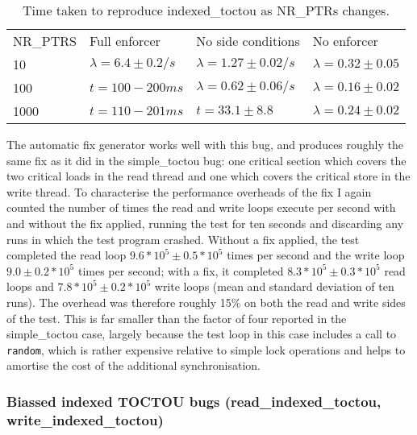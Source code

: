 \begin{table}
\begin{tabular}{llll}
NR\_PTRS & Full enforcer             & No side conditions          & No enforcer               \\
10       & $\lambda = 6.4 \pm 0.2/s$ & $\lambda = 1.27 \pm 0.02/s$ & $\lambda = 0.32 \pm 0.05$ \\
100      & $t = 100 - 200ms$         & $\lambda = 0.62 \pm 0.06/s$ & $\lambda = 0.16 \pm 0.02$ \\
1000     & $t = 110 - 201ms$         & $t = 33.1 \pm 8.8$          & $\lambda = 0.24 \pm 0.02$ \\
\end{tabular}
\caption{Time taken to reproduce indexed\_toctou as NR\_PTRs changes.}
\label{table:eval:indexedtoctou:nrptrs}
\end{table}

The automatic fix generator works well with this bug, and produces
roughly the same fix as it did in the simple\_toctou bug: one critical
section which covers the two critical loads in the read thread and one
which covers the critical store in the write thread.  To characterise
the performance overheads of the fix I again counted the number of
times the read and write loops execute per second with and without the
fix applied, running the test for ten seconds and discarding any runs
in which the test program crashed.  Without a fix applied, the test
completed the read loop $9.6 * 10^5 \pm 0.5 * 10^5$ times per second
and the write loop $9.0 \pm 0.2 * 10^5$ times per second; with a fix,
it completed $8.3 * 10^5 \pm 0.3 * 10^5$ read loops and $7.8 * 10^5
\pm 0.2 * 10^5$ write loops (mean and standard deviation of ten runs).
The overhead was therefore roughly 15\% on both the read and write
sides of the test.  This is far smaller than the factor of four reported in the
simple\_toctou case, largely because the test loop in this case
includes a call to \verb|random|, which is rather expensive relative
to simple lock operations and helps to amortise the cost of the
additional synchronisation.


\subsubsection{Biassed indexed TOCTOU bugs (read\_indexed\_toctou, write\_indexed\_toctou)}

